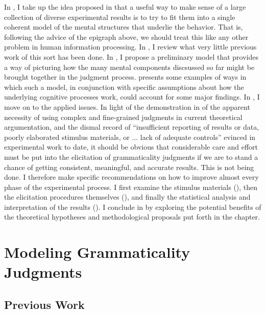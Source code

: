In , I take up the idea proposed in  that a useful way to make sense of a large collection of diverse experimental results is to try to fit them into a single coherent model of the mental structures that underlie the behavior. That is, following the advice of the epigraph above, we should treat this like any other problem in human information processing. In , I review what very little previous work of this sort has been done. In , I propose a 
preliminary model  that provides a way of picturing how the many mental components discsussed so far might be brought together in the judgment process.  presents some examples of ways in which such a model, in conjunction with specific assumptions about how the underlying cognitive processes work, could account for some major findings. In , I move on to the applied issues. In light of the demonstration in  of the apparent necessity of using complex and fine-grained judgments in current theoretical argumentation, and the dismal record of ``insufficient reporting of results or data, poorly elaborated stimulus materials, or ... lack of adequate controls'' \citep[367]{Chaudron1983}
evinced in experimental work to date, it should be obvious that considerable care and effort must be put into the elicitation of grammaticality judgments if we are to stand a chance of getting consistent, meaningful, and accurate results. This is not being done. I therefore make specific recommendations on how to improve almost every phase of the experimental process. I first examine the stimulus materials (), then the elicitation procedures themselves (), and finally the statistical analysis and interpretation of the results (). I conclude in  by exploring the potential benefits of the theoretical hypotheses and methodological proposals put forth in the chapter.

\section{Modeling Grammaticality Judgments}\label{sec:6.2}
\subsection{Previous Work}\label{sec:6.2.1}

